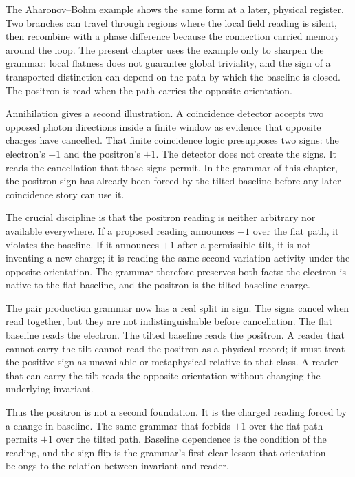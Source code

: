 The Aharonov--Bohm example shows the same form at a later, physical register.
Two branches can travel through regions where the local field reading is
silent, then recombine with a phase difference because the connection carried
memory around the loop. The present chapter uses the example only to sharpen
the grammar: local flatness does not guarantee global triviality, and the
sign of a transported distinction can depend on the path by which the
baseline is closed. The positron is read when the path carries the opposite
orientation.

Annihilation gives a second illustration. A coincidence detector accepts two
opposed photon directions inside a finite window as evidence that opposite
charges have cancelled. That finite coincidence logic presupposes two signs:
the electron's \(-1\) and the positron's \(+1\). The detector does not create
the signs. It reads the cancellation that those signs permit. In the grammar
of this chapter, the positron sign has already been forced by the tilted
baseline before any later coincidence story can use it.

The crucial discipline is that the positron reading is neither arbitrary nor
available everywhere. If a proposed reading announces \(+1\) over the flat
path, it violates the baseline. If it announces \(+1\) after a permissible
tilt, it is not inventing a new charge; it is reading the same
second-variation activity under the opposite orientation. The grammar
therefore preserves both facts: the electron is native to the flat baseline,
and the positron is the tilted-baseline charge.

The pair production grammar now has a real split in sign. The signs cancel
when read together, but they are not indistinguishable before cancellation.
The flat baseline reads the electron. The tilted baseline reads the
positron. A reader that cannot carry the tilt cannot read the positron as a
physical record; it must treat the positive sign as unavailable or
metaphysical relative to that class. A reader that can carry the tilt reads
the opposite orientation without changing the underlying invariant.

Thus the positron is not a second foundation. It is the charged reading
forced by a change in baseline. The same grammar that forbids \(+1\) over
the flat path permits \(+1\) over the tilted path. Baseline dependence is the
condition of the reading, and the sign flip is the grammar's first clear
lesson that orientation belongs to the relation between invariant and
reader.

